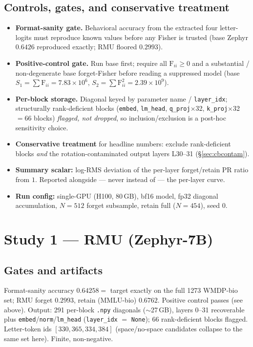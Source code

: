 \documentclass[11pt]{article}
\newcommand{\Fisher}{\ensuremath{\mathrm{F}}}
\begin{document}
\subsection{Controls, gates, and conservative treatment}
\begin{itemize}[leftmargin=1.4em,itemsep=1pt]
  \item \textbf{Format-sanity gate.} Behavioral accuracy from the extracted four letter-logits
        must reproduce known values before any Fisher is trusted (base Zephyr $0.6426$ reproduced
        exactly; RMU floored $0.2993$).
  \item \textbf{Positive-control gate.} Run base first; require all $\Fisher_{ii}\ge 0$ and a
        substantial / non-degenerate base forget-Fisher before reading a suppressed model
        (base $S_1=\sum\Fisher_{ii}=7.83\times10^{6}$, $S_2=\sum\Fisher_{ii}^2=2.39\times10^{9}$).
  \item \textbf{Per-block storage.} Diagonal keyed by parameter name / \texttt{layer\_idx};
        structurally rank-deficient blocks (\texttt{embed}, \texttt{lm\_head},
        \texttt{q\_proj}$\times$32, \texttt{k\_proj}$\times$32 $=66$ blocks) \emph{flagged, not
        dropped}, so inclusion/exclusion is a post-hoc sensitivity choice.
  \item \textbf{Conservative treatment} for headline numbers: exclude rank-deficient blocks
        \emph{and} the rotation-contaminated output layers L30--31 (\S\ref{sec:cbcontam}).
  \item \textbf{Summary scalar:} log-RMS deviation of the per-layer forget/retain PR ratio from
        $1$. Reported alongside --- never instead of --- the per-layer curve.
  \item \textbf{Run config:} single-GPU (H100, 80\,GB), bf16 model, fp32 diagonal accumulation,
        $N=512$ forget subsample, retain full ($N=454$), seed $0$.
\end{itemize}


\section{Study 1 --- RMU (Zephyr-7B)}
\subsection{Gates and artifacts}
Format-sanity accuracy $0.64258 = $ target exactly on the full 1273 WMDP-bio set; RMU forget
$0.2993$, retain (MMLU-bio) $0.6762$. Positive control passes (see above). Output: 291 per-block
\texttt{.npy} diagonals ($\sim$27\,GB), layers 0--31 recoverable plus \texttt{embed}/\texttt{norm}/\texttt{lm\_head}
(\texttt{layer\_idx} $=$ \texttt{None}); 66 rank-deficient blocks flagged. Letter-token ids
$[330,365,334,384]$ (space/no-space candidates collapse to the same set here). Finite, non-negative.
\end{document}
